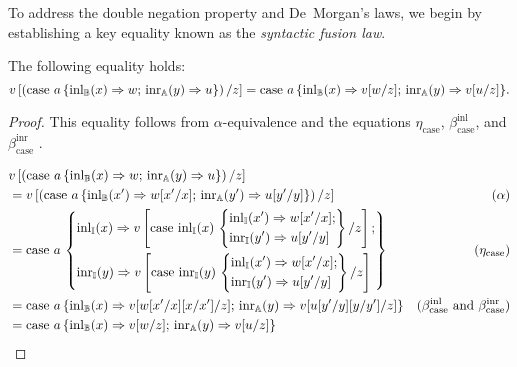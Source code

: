 To address the double negation property and De~Morgan's laws, we begin by establishing a key equality known as the \emph{syntactic fusion law}.

\begin{lemma} 
  The following equality holds:
  \begin{equation*}
   v \left[ \left(\text{case } a \,\{\mathrm{inl}_{\mathbb{B}}(x) \Rightarrow w ; \, \mathrm{inr}_{\mathbb{A}}(y) \Rightarrow u\}\right)  / z \right]  =  \text{case } a \,\{\mathrm{inl}_{\mathbb{B}}(x) \Rightarrow v[w/z] ; \, \mathrm{inr}_{\mathbb{A}}(y) \Rightarrow v[u/z]\}.
  \end{equation*}
\end{lemma}

  \begin{proof}
    
This equality follows from  $\alpha$-equivalence and the equations $\eta_{\text{case}}$, $\beta_{\text{case}}^{\text{inl}}$, and $\beta_{\text{case}}^{\text{inr}}$ . 

\begin{equation*}
\begin{split}
  & v \left[ \left(\text{case } a \,\{\mathrm{inl}_{\mathbb{B}}(x) \Rightarrow w ; \, \mathrm{inr}_{\mathbb{A}}(y) \Rightarrow u\}\right)  / z \right] & \\
  & =v  \left[ \left(\text{case } a \,\{\mathrm{inl}_{\mathbb{B}}(x') \Rightarrow w[x'/x] ; \, \mathrm{inr}_{\mathbb{A}}(y') \Rightarrow u[y'/y]\}\right)  / z \right] & (\alpha) \\
  & = \text{case } a\,
\left\{
    \begin{aligned} 
    &\mathrm{inl}_{\mathbb{I}}(x) \Rightarrow v \left[ \text{case } \mathrm{inl}_{\mathbb{I}}(x)\,
\left\{
    \begin{aligned} 
    &\mathrm{inl}_{\mathbb{I}}(x') \Rightarrow w[x'/x] ; \\
    &\mathrm{inr}_{\mathbb{I}}(y') \Rightarrow u[y'/y]  \\ 
  \end{aligned}  
  \right\} / z \right] ; \\
    &\mathrm{inr}_{\mathbb{I}}(y) \Rightarrow   v \left[ \text{case } \mathrm{inr}_{\mathbb{I}}(y)\,
\left\{
    \begin{aligned} 
    &\mathrm{inl}_{\mathbb{I}}(x') \Rightarrow w[x'/x] ; \\
    &\mathrm{inr}_{\mathbb{I}}(y') \Rightarrow u[y'/y]  \\ 
  \end{aligned}  
  \right\} / z \right] \\
  \end{aligned}  
  \right\} & (\eta_{\text{case}}) \\
   & = \text{case } a \,\{\mathrm{inl}_{\mathbb{B}}(x) \Rightarrow v[w[x'/x][x/x']/z] ; \, \mathrm{inr}_{\mathbb{A}}(y) \Rightarrow v[u[y'/y][y/y']/z]\}   & (\beta_{\text{case}}^{\text{inl}} \text{ and } \beta_{\text{case}}^{\text{inr}}  ) \\
   & =  \text{case } a \,\{\mathrm{inl}_{\mathbb{B}}(x) \Rightarrow v[w/z] ; \, \mathrm{inr}_{\mathbb{A}}(y) \Rightarrow v[u/z]\}   
\end{split}
\end{equation*}
  \end{proof}



